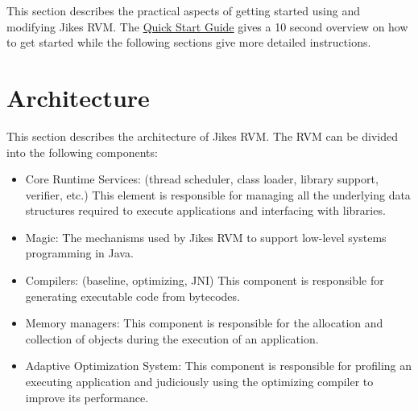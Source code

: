 \documentclass[a4paper]{book}
\begin{document}
This section describes the practical aspects of getting started using and modifying Jikes RVM. The \hyperref[sec:quickstartguide]{Quick Start Guide} gives a 10 second overview on how to get started while the following sections give more detailed instructions.















































\chapter{Architecture}
\label{cha:architecture}

This section describes the architecture of Jikes RVM. The RVM can be divided into the following components:

\begin{itemize}
  \item Core Runtime Services: (thread scheduler, class loader, library support, verifier, etc.) This element is responsible for managing all the underlying data structures required to execute applications and interfacing with libraries.
  \item Magic: The mechanisms used by Jikes RVM to support low-level systems programming in Java.
  \item Compilers: (baseline, optimizing, JNI) This component is responsible for generating executable code from bytecodes.
  \item Memory managers: This component is responsible for the allocation and collection of objects during the execution of an application.
  \item Adaptive Optimization System: This component is responsible for profiling an executing application and judiciously using the optimizing compiler to improve its performance.
\end{itemize}
\end{document}
